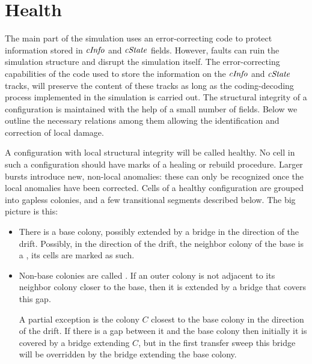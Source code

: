 \documentclass[12pt]{memoir}
\newcommand{\authnote}[3]
{\text{{ \textcolor{#3}{\( \langle\hspace{-0.2em}\langle \)\textsf{\footnotesize #1: #2}\( \rangle\hspace{-0.2em}\rangle \)}}}}
\newcommand{\authnote}[2]{}
\newcommand{\Pnote}[1]{{\authnote{P}{#1}{cyan}}}
\newcommand{\fld}[1]{\ensuremath{\textit{#1\/}}}
\newcommand{\cInfo}{\fld{cInfo}}
\newcommand{\cState}{\fld{cState}}
\begin{document}
\section{Health}            \label{sec:health}

The main part of the simulation uses an error-correcting
code to protect information stored in \( \cInfo \) and \( \cState \) fields.
However, faults can ruin the simulation structure and disrupt the simulation itself.
The error-correcting capabilities of the code 
used to store the information on the \( \cInfo \) and
\( \cState \) tracks, will preserve the content of these tracks as long as the coding-decoding
process implemented in the simulation is carried out.
The structural integrity of a configuration is maintained with the help of a small number
of fields.
Below we outline the necessary relations among them 
allowing the identification and correction of local damage.

A configuration with local structural integrity will be called healthy.
No cell in such a configuration should have marks of a healing or
rebuild procedure.
Larger bursts introduce new, non-local anomalies: these can only be recognized
once the local anomalies have been corrected.
Cells of a healthy configuration are grouped into gapless colonies, and 
a few transitional segments described below.
The big picture is this:
\begin{itemize}
\item There is a base colony, possibly extended by a bridge in the direction of
  the drift.
Possibly, in the direction of the drift, the neighbor colony of the base is a 
, its cells are marked as such.
\item Non-base colonies are called .
If an outer colony is not adjacent to its neighbor colony closer to the base,
then it is extended by a bridge that covers this gap.

A partial exception is the colony \( C \) closest to the base colony in the direction of the
drift.
If there is a gap between it and the base colony then initially it is covered by 
a bridge extending \( C \), but in the first transfer sweep this bridge will be
overridden by the bridge extending the base colony.
\end{itemize}
\Pnote{Pictures!}
\end{document}
